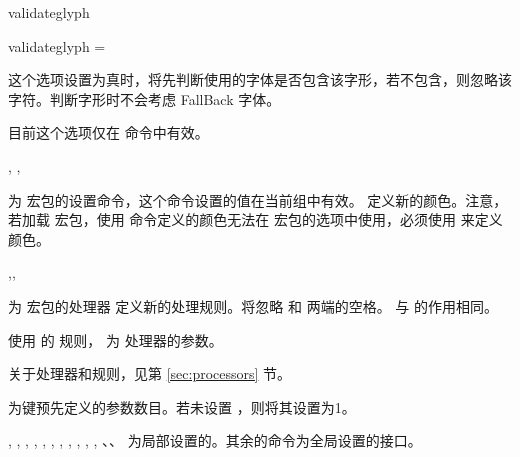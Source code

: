 \documentclass{ctxdoc}
\begin{document}
\begin{function}{validateglyph}
  \begin{syntax}
    validateglyph = \TTF {}
  \end{syntax}
  这个选项设置为真时，将先判断使用的字体是否包含该字形，若不包含，则忽略该字符。判断字形时不会考虑 FallBack 字体。

  目前这个选项仅在  命令中有效。
\end{function}

\begin{function}{
  \zitiesetup,
  \zitiecolorlet,
}
  \begin{syntax}
     
       
  \end{syntax}
   为  宏包的设置命令，这个命令设置的值在当前组中有效。 定义新的颜色。注意，若加载  宏包，使用  命令定义的颜色无法在  宏包的选项中使用，必须使用  来定义颜色。
\end{function}

\begin{function}{\zitienewprocessorrule,\zitienewrule,\zitieuseprocessorrule}
  \begin{syntax}
        
        
  \end{syntax}
   为  宏包的处理器  定义新的处理规则。将忽略  和  两端的空格。
   与  的作用相同。
  
   使用  的  规则， 为  处理器的参数。

  关于处理器和规则，见第 \ref{sec:processors} 节。

   为键预先定义的参数数目。若未设置 ，则将其设置为1。
\end{function}

\begin{function}{
  \zitiebasechar,
  \zitiebasecharwidth,
  \zitiebasecharheight,
  \zitiewidth,
  \zitieheight,
  \zitieboxwd,
  \zitieboxht,
  \zitieboxdp,
  \zitiefontname,
  \zitiexscaleratio,
  \zitieyscaleratio,
}
  、、 为局部设置的。其余的命令为全局设置的接口。
\end{function}
\end{document}
